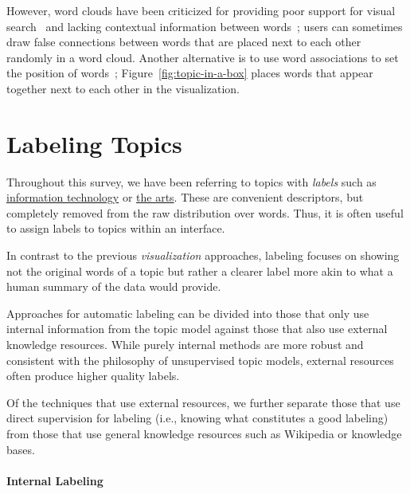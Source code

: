 However, word clouds have been criticized for providing poor support for visual
search~\citep{Viegas2008} and lacking contextual information between
words~\citep{harris11}; users can sometimes draw false connections between words
that are placed next to each other randomly in a word cloud.  Another
alternative is to use word associations to set the position of
words~\citep{Smith:Chuang:Hu:Boyd-Graber:Findlater-2014};
Figure~\ref{fig:topic-in-a-box} places words that appear together next to
each other in the visualization.



\section{Labeling Topics}

Throughout this survey, we have been referring to topics with \emph{labels} such as
\underline{information technology} or \underline{the arts}.  These are
convenient descriptors, but completely removed from the raw distribution over words.
Thus, it is often useful to assign labels to topics within an interface.

In contrast to the previous \emph{visualization} approaches, labeling
focuses on showing not the original words of a topic but rather a
clearer label more akin to what a human summary of the data would
provide.

Approaches for automatic labeling can be divided into those that only
use internal information from the topic model against those that also
use external knowledge resources.  While purely internal methods are
more robust and consistent with the philosophy of unsupervised topic
models, external resources often produce higher quality
labels.

Of the techniques that use external resources, we further separate
those that use direct supervision for labeling (i.e., knowing what
constitutes a good labeling) from those that use general knowledge
resources such as Wikipedia or knowledge bases.

\paragraph{Internal Labeling}

